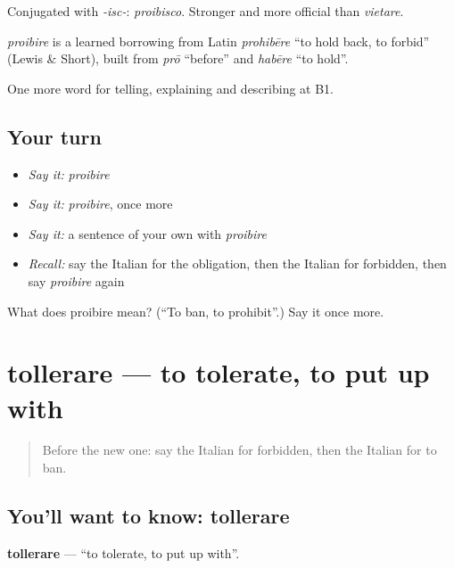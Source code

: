 Conjugated with \emph{-isc-}: \emph{proibisco}. Stronger and more official than \emph{vietare}.

\begin{cousinweb}
\emph{proibire} is a learned borrowing from Latin \emph{prohibēre} \textquotedblleft{}to hold back, to forbid\textquotedblright{} (Lewis \& Short), built from \emph{prō} \textquotedblleft{}before\textquotedblright{} and \emph{habēre} \textquotedblleft{}to hold\textquotedblright{}.
\end{cousinweb}

\begin{grammarlens}[title={What you've built}]
One more word for telling, explaining and describing at B1.
\end{grammarlens}

\subsection*{Your turn}
\begin{itemize}
\raggedright
  \item \emph{Say it:} \emph{proibire}
  \item \emph{Say it:} \emph{proibire}, once more
  \item \emph{Say it:} a sentence of your own with \emph{proibire}
  \item \emph{Recall:} say the Italian for the obligation, then the Italian for forbidden, then say \emph{proibire} again
\end{itemize}

\begin{tcolorbox}[breakable,colback=teal!4,colframe=teal!35!black,title={Before you move on}]
What does proibire mean? (\textquotedblleft{}To ban, to prohibit\textquotedblright{}.) Say it once more.
\end{tcolorbox}
\section[tollerare]{tollerare — to tolerate, to put up with}

\label{lesson:IT-C385-tollerare}



\begin{quote}
Before the new one: say the Italian for forbidden, then the Italian for to ban.
\end{quote}

\subsection*{You'll want to know: tollerare}
\textbf{tollerare} — \textquotedblleft{}to tolerate, to put up with\textquotedblright{}.

